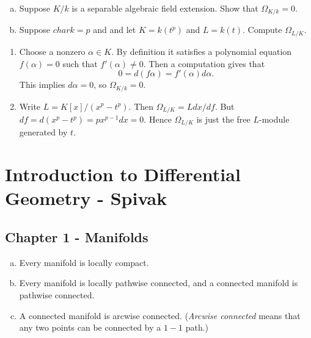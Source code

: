 \documentclass[11pt, english]{article}
\begin{document}
\begin{exc}[Excercise 21.2.F]
\begin{enumerate}[a)]
\item Suppose $K/k$ is a separable algebraic field extension. Show that $\Omega_{K/k}=0$.
\item Suppose $char k = p$ and and let $K = k(t^p)$ and $L=k(t)$. Compute $\Omega_{L/K}$. 
\end{enumerate}
\end{exc}
\begin{sol}
\begin{enumerate}
\item Choose a nonzero $\alpha \in K$. By definition it satisfies a polynomial equation $f(\alpha)=0$ such that $f'(\alpha) \neq 0$. Then a computation gives that
$$
0 = d(f\alpha) = f'(\alpha)d\alpha.
$$
This implies $d \alpha = 0$, so $\Omega_{K/k}=0$.
\item Write $L=K[x]/(x^p-t^p)$. Then $\Omega_{L/K}=L dx/df$. But $df=d(x^p-t^p)=px^{p-1}dx=0$. Hence $\Omega_{L/K}$ is just the free $L$-module generated by $t$. 
\end{enumerate}
\end{sol}



\section{Introduction to Differential Geometry - Spivak}

\subsection{Chapter 1 - Manifolds}

\begin{exc}[Exercise 3]
  \begin{enumerate}[a)]
  \item Every manifold is locally compact.
\item Every manifold is locally pathwise connected, and a connected manifold is pathwise connected.
\item A connected manifold is arcwise connected. (\emph{Arcwise connected} means that any two points can be connected by a $1-1$ path.)
  \end{enumerate}
\end{exc}
\end{document}
